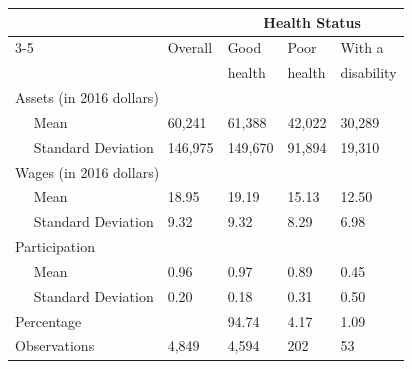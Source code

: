 
  
  \begin{tabular}{p{4.5cm} p{1.9cm} p{1.5cm} p{1.5cm} p{1.5cm} } %
    \toprule
    \hline
    & &\multicolumn{3}{c}{Health Status}\\ %
       \cmidrule(lr){3-5}    
&  Overall&Good& Poor& With a \\ 
&  &health& health& disability \\ 
 \midrule
  \multicolumn{2}{l}{Assets (in 2016 dollars) }&\\
 $\quad$ Mean & 60,241      & 61,388 &42,022    & 30,289\\
  $\quad$ Standard Deviation &146,975 & 149,670  &91,894& 19,310 \\[0.5ex] 
  
    \multicolumn{2}{l}{Wages (in 2016 dollars)} &\\
$\quad$ Mean &18.95  &  19.19   & 15.13      & 12.50   \\
$\quad$ Standard Deviation & 9.32 &9.32 &8.29  & 6.98\\[0.5ex] 
Participation \\
 $\quad$ Mean & 0.96     & 0.97 &0.89    & 0.45\\
  $\quad$ Standard Deviation &0.20 & 0.18  &0.31&0.50 \\[0.5ex] 
  
Percentage & &  94.74  &4.17  & 1.09 \\[0.5ex] 
Observations & 4,849   &4,594 &202&53    \\    [0.5ex] 
                     \hline 
                     \bottomrule
    \end{tabular}
